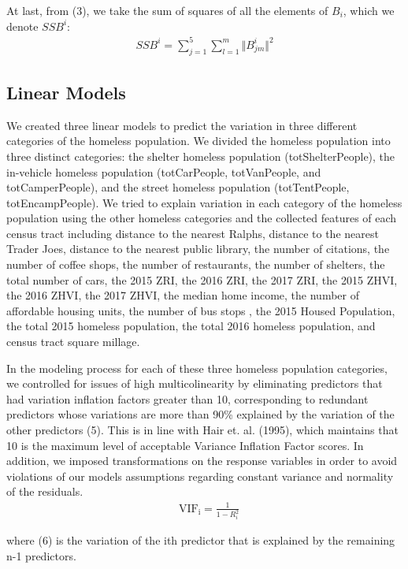 \documentclass[11pt,letterpaper]{article}
\begin{document}
At last, from (3), we take the sum of squares of all the elements of $B_{i}$, which we denote $SSB^{i}$:
\begin{align}
SSB^{i} = \sum_{j=1}^{5}\sum_{l=1}^{m}\Vert B^{i}_{jm} \Vert ^{2}
\end{align}
\subsection{Linear Models}

We created three linear models to predict the variation in three different categories of the homeless population. We divided the homeless population into three distinct categories: the shelter homeless population (totShelterPeople), the in-vehicle homeless population (totCarPeople, totVanPeople, and totCamperPeople), and the street homeless population (totTentPeople, totEncampPeople). We tried to explain variation in each category of the homeless population using the other homeless categories  and the collected features of each census tract including distance to the nearest Ralphs, distance to the nearest Trader Joes, distance to the nearest public library, the number of citations, the number of coffee shops, the number of restaurants, the number of shelters, the total number of cars, the 2015 ZRI, the 2016 ZRI, the 2017 ZRI, the 2015 ZHVI, the 2016 ZHVI, the 2017 ZHVI, the median home income, the number of affordable housing units,  the number of bus stops , the 2015 Housed Population, the total 2015 homeless population, the total 2016 homeless population, and census tract square millage. 

In the modeling process for each of these three homeless population categories, we controlled for issues of high multicolinearity by eliminating predictors that had variation inflation factors greater than 10, corresponding to redundant predictors whose variations are more than 90\% explained by the variation of the other predictors (5). This is in line with Hair et. al. (1995), which maintains that 10 is the maximum level of acceptable Variance Inflation Factor scores. In addition, we imposed transformations on the response variables in order to avoid violations of our models assumptions regarding constant variance and normality of the residuals.
\begin{align}
    &\mathrm {VIF_{i}} ={\frac {1}{1-R_{i}^{2}}}
\end{align}
    

    where (6) is the variation of the ith predictor that is explained by the remaining n-1 predictors.
\end{document}
